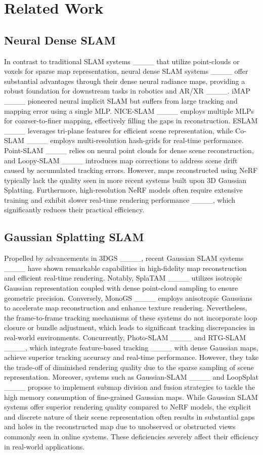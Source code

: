 \section{Related Work}
\subsection{Neural Dense SLAM}
In contrast to traditional SLAM systems ____ that utilize point-clouds or voxels for sparse map representation, neural dense SLAM systems ____ offer substantial advantages through their dense neural radiance maps, providing a robust foundation for downstream tasks in robotics and AR/XR ____. iMAP ____ pioneered neural implicit SLAM but suffers from large tracking and mapping error using a single MLP. NICE-SLAM ____ employs multiple MLPs for coarser-to-finer mapping, effectively filling the gaps in reconstruction. ESLAM ____ leverages tri-plane features for efficient scene representation, while Co-SLAM ____ employs multi-resolution hash-grids for real-time performance. Point-SLAM ____ relies on neural point clouds for dense scene reconstruction, and Loopy-SLAM ____ introduces map corrections to address scene drift caused by accumulated tracking errors. However, maps reconstructed using NeRF typically lack the quality seen in more recent systems built upon 3D Gaussian Splatting. Furthermore, high-resolution NeRF models often require extensive training and exhibit slower real-time rendering performance ____, which significantly reduces their practical efficiency.

\subsection{Gaussian Splatting SLAM}

Propelled by advancements in 3DGS ____, recent Gaussian SLAM systems ____ have shown remarkable capabilities in high-fidelity map reconstruction and efficient real-time rendering. Notably, SplaTAM ____ utilizes isotropic Gaussian representation coupled with dense point-cloud sampling to ensure geometric precision. Conversely, MonoGS ____ employs anisotropic Gaussians to accelerate map reconstruction and enhance texture rendering. Nevertheless, the frame-to-frame tracking mechanisms of these systems do not incorporate loop closure or bundle adjustment, which leads to significant tracking discrepancies in real-world environments. Concurrently, Photo-SLAM ____ and RTG-SLAM ____, which integrate feature-based tracking ____ with dense Gaussian maps, achieve superior tracking accuracy and real-time performance. However, they take the trade-off of diminished rendering quality due to the sparse sampling of scene representation. Moreover, systems such as Gaussian-SLAM ____ and LoopSplat ____ propose to implement submap division and fusion strategies to tackle the high memory consumption of fine-grained Gaussian maps. While Gaussian SLAM systems offer superior rendering quality compared to NeRF models, the explicit and discrete nature of their scene representation often results in substantial gaps and holes in the reconstructed map due to unobserved or obstructed views commonly seen in online systems. These deficiencies severely affect their efficiency in real-world applications.

